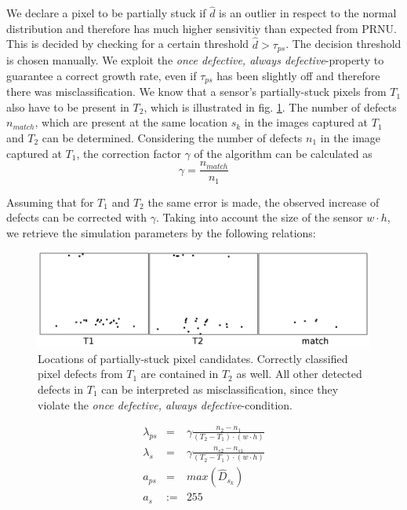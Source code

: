 \documentclass[10pt,twocolumn,letterpaper]{article}
\begin{document}
We declare a pixel to be partially stuck if $\hat{d}$ is an outlier in respect to the normal distribution and therefore has much higher sensivitiy than expected from PRNU. This is decided by checking for a certain threshold $\hat{d} > \tau_{ps}$. The decision threshold is chosen manually. We exploit the \emph{once defective, always defective}-property to guarantee a correct growth rate, even if $\tau_{ps}$ has been slightly off and therefore there was misclassification. We know that a sensor's partially-stuck pixels from $T_1$ also have to be present in $T_2$, which is illustrated in fig. \ref{fig:defectPersistence}. The number of defects $n_{match}$, which are present at the same location $s_k$ in the images captured at $T_1$ and $T_2$ can be determined. Considering the number of defects $n_1$ in the image captured at $T_1$, the correction factor $\gamma$ of the algorithm can be calculated as
\begin{equation}
\gamma = \frac{n_{match}}{n_1}
\end{equation}

Assuming that for $T_1$ and $T_2$ the same error is made, the observed increase of defects can be corrected with $\gamma$. Taking into account the size of the sensor $w\cdot h$, we retrieve the simulation parameters by the following relations: 

\begin{figure}
  \centering
  \includegraphics[width=\linewidth]{img/detectedLocations.png}
  \caption{Locations of partially-stuck pixel candidates. Correctly classified pixel defects from $T_1$ are contained in $T_2$ as well. All other detected defects in $T_1$ can be interpreted as misclassification, since they violate the \emph{once defective, always defective}-condition.}
  \label{fig:defectPersistence}
\end{figure}


\begin{eqnarray}
 \lambda_{ps} 	& = 	& \gamma \frac{n_2-n_1}{(T_2-T_1)\cdot(w \cdot h)} \\ 
 \lambda_{s} 	& = 	& \gamma  \frac{n_{s2}-n_{s1}}{(T_2-T_1)\cdot(w \cdot h)} \\
 a_{ps} 	& = 	&max(\hat{D}_{s_k}) \\ 
 a_{s} 		&:= 	& 255
\end{eqnarray}
\end{document}
